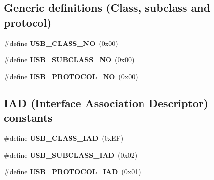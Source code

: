 \subsection*{Generic definitions (Class, subclass and protocol)}
\begin{DoxyCompactItemize}
\item 
\mbox{\label{group__usb__protocol__group_ga12eed4a35cdb30cfab748b3d86127b8d}} 
\#define {\bfseries U\+S\+B\+\_\+\+C\+L\+A\+S\+S\+\_\+\+NO}~(0x00)
\item 
\mbox{\label{group__usb__protocol__group_ga98cc0e1d6213e6f3b2b8c42acb544bc1}} 
\#define {\bfseries U\+S\+B\+\_\+\+S\+U\+B\+C\+L\+A\+S\+S\+\_\+\+NO}~(0x00)
\item 
\mbox{\label{group__usb__protocol__group_ga10b1afa0082bedfe292bda9a71d9b461}} 
\#define {\bfseries U\+S\+B\+\_\+\+P\+R\+O\+T\+O\+C\+O\+L\+\_\+\+NO}~(0x00)
\end{DoxyCompactItemize}
\subsection*{I\+AD (Interface Association Descriptor) constants}
\begin{DoxyCompactItemize}
\item 
\mbox{\label{group__usb__protocol__group_gaaf2d6c6cd7b43e2372cd74cf1b36f82c}} 
\#define {\bfseries U\+S\+B\+\_\+\+C\+L\+A\+S\+S\+\_\+\+I\+AD}~(0x\+E\+F)
\item 
\mbox{\label{group__usb__protocol__group_ga3a637995f1146443c98cfd98185a2b83}} 
\#define {\bfseries U\+S\+B\+\_\+\+S\+U\+B\+C\+L\+A\+S\+S\+\_\+\+I\+AD}~(0x02)
\item 
\mbox{\label{group__usb__protocol__group_ga1355b59155724e3838b207d50637e3bc}} 
\#define {\bfseries U\+S\+B\+\_\+\+P\+R\+O\+T\+O\+C\+O\+L\+\_\+\+I\+AD}~(0x01)
\end{DoxyCompactItemize}
